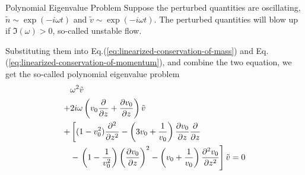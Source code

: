 \begin{frame}{Polynomial Eigenvalue Problem}
  Suppose the perturbed quantities are oscillating, $\tilde{n}\sim \exp(-i\omega t)$ and $\tilde{v} \sim \exp(-i\omega t)$. The perturbed quantities will blow up if $\Im(\omega) > 0$, so-called unstable flow. 

  Substituting them into Eq.(\ref{eq:linearized-conservation-of-mass}) and Eq.(\ref{eq:linearized-conservation-of-momentum}), and combine the two equation, we get the so-called polynomial eigenvalue problem
  \begin{equation}
    \begin{aligned}
      &\omega^2 \tilde{v} \\ 
      +& 2i\omega\left(v_0\pdv{}{z} + \pdv{v_0}{z}\right) \tilde{v} \\
      +& \left[ (1-v_0^2)\pdv[2]{}{z} 
        -\left(3v_0 + \frac{1}{v_0}\right)\pdv{v_0}{z}\pdv{}{z} \right. \\
        &- \left. \left(1-\frac{1}{v_0^2}\right)\left(\pdv{v_0}{z}\right)^2 
      - \left(v_0+\frac{1}{v_0}\right)\pdv[2]{v_0}{z} \right]\tilde{v}
      = 0
    \end{aligned}
    \label{eq:polynomial_eigenvalue_problem}
  \end{equation}
\end{frame}
